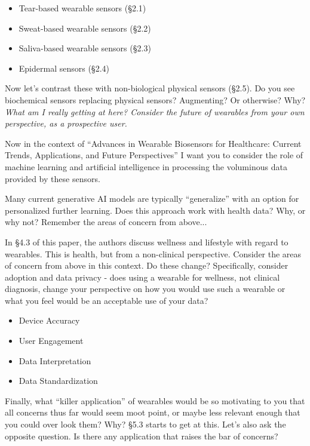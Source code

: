 \documentclass[11pt]{article}
\begin{document}
\begin{itemize}
	\item Tear-based wearable sensors (\S2.1)
	\item Sweat-based wearable sensors (\S2.2)
	\item Saliva-based wearable sensors (\S2.3)
	\item Epidermal sensors (\S2.4)
\end{itemize}
\vspace{0.5in}

Now let's contrast these with non-biological physical sensors (\S2.5).  Do you see biochemical sensors replacing physical sensors?  Augmenting?  Or otherwise?  Why?  {\em What am I really getting at here? Consider the future of wearables from your own perspective, as a prospective user.}

\vspace{0.5in}

Now in the context of ``Advances in Wearable Biosensors for Healthcare: Current Trends, Applications, and Future Perspectives'' I want you to consider the role of machine learning and artificial intelligence in processing the voluminous data provided by these sensors.

Many current generative AI models are typically ``generalize'' with an option for personalized further learning.  Does this approach work with health data?  Why, or why not?  Remember the areas of concern from above...

\vspace{0.5in}

In \S4.3 of this paper, the authors discuss wellness and lifestyle with regard to wearables.  This is health, but from a non-clinical perspective.  Consider the areas of concern from above in this context.  Do these change?  Specifically, consider adoption and data privacy - does using a wearable for wellness, not clinical diagnosis, change your perspective on how you would use such a wearable or what you feel would be an acceptable use of your data?

\begin{itemize}
	\item Device Accuracy
	\item User Engagement
	\item Data Interpretation
	\item Data Standardization
\end{itemize}
\vspace{0.5in}

Finally, what ``killer application'' of wearables would be so motivating to you that all concerns thus far would seem moot point, or maybe less relevant enough that you could over look them?  Why?  \S5.3 starts to get at this.  Let's also ask the opposite question.  Is there any application that raises the bar of concerns?
\end{document}
